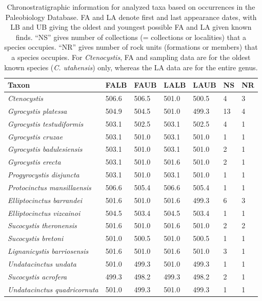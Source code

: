 \documentclass{article}
\begin{document}
\begin{table}[]
\caption{Chronostratigraphic information for analyzed taxa based on occurrences in the Paleobiology Database.  FA and LA denote first and last appearance dates, with LB and UB giving the oldest and youngest possible FA and LA given known finds. “NS” gives number of collections (= collections or localities) that a species occupies.  “NR” gives number of rock units (formations or members) that a species occupies.  For \textit{Ctenocystis}, FA and sampling data are for the oldest known species (\textit{C. utahensis}) only, whereas the LA data are for the entire genus.}
\begin{tabular}{l|llIIlI}
Taxon      & FALB & FAUB & LALB & LAUB & NS & NR \\ \hline
\textit{Ctenocystis} & 506.6 & 506.5 & 501.0 & 500.5 & 4 & 3\\
\textit{Gyrocystis platessa} & 504.9 & 504.5 & 501.0 & 499.3 & 13 & 4\\
\textit{Gyrocystis testudiformis} & 503.1 & 502.5 & 503.1 & 502.5 & 4 & 1\\
\textit{Gyrocystis cruzae} & 503.1 & 501.0 & 503.1 & 501.0 & 1 & 1\\
\textit{Gyrocystis badulesiensis} & 503.1 & 501.0 & 503.1 & 501.0 & 2 & 1\\
\textit{Gyrocystis erecta} & 503.1 & 501.0 & 501.6 & 501.0 & 2 & 1\\
\textit{Progyrocystis disjuncta} & 503.1 & 501.0 & 503.1 & 501.0 & 1 & 1\\
\textit{Protocinctus mansillaensis} & 506.6 & 505.4 & 506.6 & 505.4 & 1 & 1\\
\textit{Elliptocinctus barrandei} & 501.6 & 501.0 & 501.6 & 499.3 & 6 & 3\\
\textit{Elliptocinctus vizcainoi} & 504.5 & 503.4 & 504.5 & 503.4 & 1 & 1\\
\textit{Sucocystis theronensis} & 501.6 & 501.0 & 501.6 & 501.0 & 2 & 2\\
\textit{Sucocystis bretoni} & 501.0 & 500.5 & 501.0 & 500.5 & 1 & 1\\
\textit{Lignanicystis barriosensis} & 501.6 & 501.0 & 501.6 & 501.0 & 3 & 1\\
\textit{Undatacinctus undata} & 501.0 & 499.3 & 501.0 & 499.3 & 1 & 1\\
\textit{Sucocystis acrofera} & 499.3 & 498.2 & 499.3 & 498.2 & 2 & 1\\
\textit{Undatacinctus quadricornuta} & 501.0 & 499.3 & 501.0 & 499.3 & 1 & 1\\

\end{tabular}
\end{table}
\end{document}

